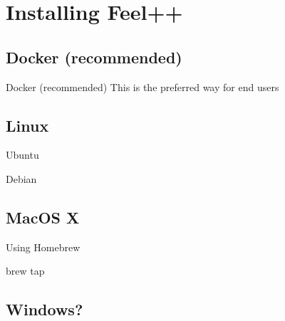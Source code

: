 \section{Installing Feel++}

\subsection{Docker (recommended)}

\begin{frame}{Docker (recommended)}
  This is the preferred way for end users


\end{frame}

\subsection{Linux}

\begin{frame}{Ubuntu}

\end{frame}

\begin{frame}{Debian}

\end{frame}

\subsection{MacOS X}


\begin{frame}[fragile]{Using Homebrew}
  \begin{bashcode}
    brew tap
  \end{bashcode}
\end{frame}


\subsection{Windows?}


